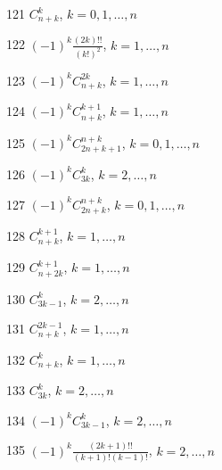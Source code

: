 \documentclass[11pt, russian]{article}
\begin{document}
121 
$C_{n+k}^{k}$, $k=0,1,\ldots,n$\par\vspace{5mm}

122 
$(-1)^{k}\frac{(2k)!!}{(k!)^2}$, $k=1,\ldots,n$\par\vspace{5mm}

123 
$(-1)^{k}C_{n+k}^{2k}$, $k=1,\ldots,n$\par\vspace{5mm}

124 
$(-1)^{k}C_{n+k}^{k+1}$, $k=1,\ldots,n$\par\vspace{5mm}

125 
$(-1)^{k}C_{2n+k+1}^{n+k}$, $k=0,1,\ldots,n$\par\vspace{5mm}

126 
$(-1)^{k}C_{3k}^{k}$, $k=2,\ldots,n$\par\vspace{5mm}

127 
$(-1)^{k}C_{2n+k}^{n+k}$, $k=0,1,\ldots,n$\par\vspace{5mm}

128 
$C_{n+k}^{k+1}$, $k=1,\ldots,n$\par\vspace{5mm}

129 
$C_{n+2k}^{k+1}$, $k=1,\ldots,n$\par\vspace{5mm}

130 
$C_{3k-1}^{k}$, $k=2,\ldots,n$\par\vspace{5mm}

131 
$C_{n+k}^{2k-1}$, $k=1,\ldots,n$\par\vspace{5mm}

132 
$C_{n+k}^{k}$, $k=1,\ldots,n$\par\vspace{5mm}

133 
$C_{3k}^{k}$, $k=2,\ldots,n$\par\vspace{5mm}

134 
$(-1)^{k}C_{3k-1}^{k}$, $k=2,\ldots,n$\par\vspace{5mm}

135 
$(-1)^{k}\frac{(2k+1)!!}{(k+1)!(k-1)!}$, $k=2,\ldots,n$\par\vspace{5mm}
\end{document}
